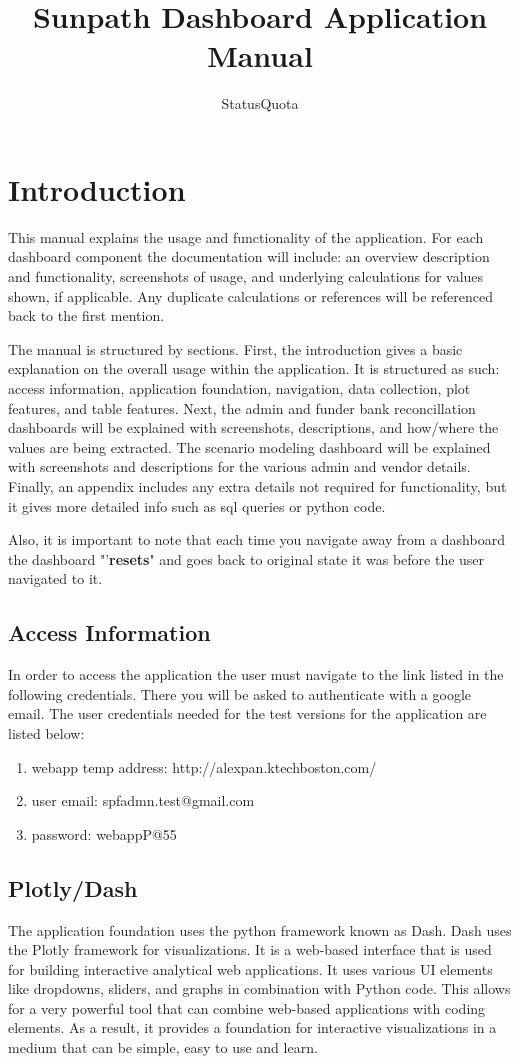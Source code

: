 \documentclass[titlepage]{article}
\author{StatusQuota}
\title{Sunpath Dashboard Application Manual}
\begin{document}
\maketitle
\tableofcontents
\newpage
\section{Introduction}
This manual explains the usage and functionality of the application. For each dashboard component the documentation will include: an overview description and functionality, screenshots of usage, and underlying calculations for values shown, if applicable. Any duplicate calculations or references will be referenced back to the first mention. 

The manual is structured by sections. First, the introduction gives a basic explanation on the overall usage within the application. It is structured as such: access information, application foundation, navigation, data collection, plot features, and table features. Next, the admin and funder bank reconcillation dashboards will be explained with screenshots, descriptions, and how/where the values are being extracted. The scenario modeling dashboard will be explained with screenshots and descriptions for the various admin and vendor details. Finally, an appendix includes any extra details not required for functionality, but it gives more detailed info such as sql queries or python code. 

Also, it is important to note that each time you navigate away from a dashboard the dashboard "'\textbf{resets}" and goes back to original state it was before the user navigated to it. 

\subsection{Access Information}
In order to access the application the user must navigate to the link listed in the following credentials. There you will be asked to authenticate with a google email. The user credentials needed for the test versions for the application are listed below: 
\begin{enumerate}
	\item webapp temp address: http://alexpan.ktechboston.com/
	\item user email: spfadmn.test@gmail.com
	\item password: webappP@55
\end{enumerate}
\newpage
\subsection{Plotly/Dash}
The application foundation uses the python framework known as Dash. Dash uses the Plotly framework for visualizations. It is a web-based interface that is used for building interactive analytical web applications. It uses various UI elements like dropdowns, sliders, and graphs in combination with Python code. This allows for a very powerful tool that can combine web-based applications with coding elements. As a result, it provides a foundation for interactive visualizations in a medium that can be simple, easy to use and learn.  
\end{document}
